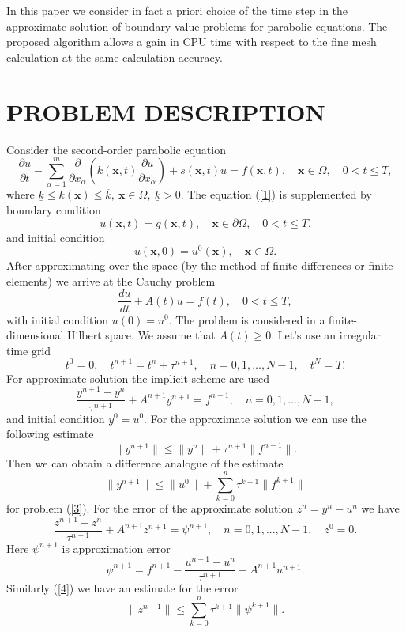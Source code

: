 \documentclass{aip-cp}
\begin{document}
In this paper we consider in fact a priori choice of the time step in the approximate solution of boundary value problems for parabolic equations. The proposed algorithm allows a gain in CPU time with respect to the fine mesh calculation at the same calculation accuracy.

\section{PROBLEM DESCRIPTION}
Consider the second-order parabolic equation
\begin{equation}\label{1}
   \frac{\partial u}{\partial t} 
   - \sum_{\alpha =1}^{m}
   \frac{\partial }{\partial x_\alpha} 
   \left ( k({\bm x},t)  \frac{\partial u}{\partial x_\alpha} \right ) + s({\bm x},t) u = f({\bm x},t),
   \quad {\bm x}\in \Omega,
   \quad 0 < t \leq  T,
\end{equation}
where
$\underline{k} \leq k({\bm x}) \leq  \overline{k}, \ {\bm x} \in \Omega, \ \underline{k} > 0$.
The equation (\ref{1}) is supplemented by boundary  condition
\[
   u({\bm x},t) = g({\bm x},t),
   \quad {\bm x}\in \partial \Omega,
   \quad 0 < t \leq  T.
\]
and initial condition
\[
   u({\bm x},0) = u^0({\bm x}),
   \quad {\bm x}\in \Omega.
\]
After approximating over the space (by the method of finite differences or finite elements) we arrive at the Cauchy problem
\begin{equation}\label{2}
\frac{du}{dt} + A(t)u =f(t), \quad 0 < t \leq T,
\end{equation}
with initial condition $u(0) = u^0$. The problem is considered in a finite-dimensional Hilbert space.
We assume that $A(t) \geq 0$.
Let's use an irregular time grid
\[
t^0 = 0, \quad t^{n+1} = t^n + \tau^{n+1}, \quad 
n = 0, 1, ... , N-1, \quad t^N = T.
\]
For approximate solution the implicit scheme are used
\begin{equation}\label{3}
  \frac{y^{n+1} - y^{n}}{\tau^{n+1}} + A^{n+1} y^{n+1} = f^{n+1},
  \quad n = 0,1, ..., N-1, 
\end{equation}
and initial condition 
$
y^0 = u^0 .
$
For the approximate solution we can use the following estimate
\[
 \|y^{n+1}\| \leq \|y^{n}\| + \tau^{n+1} \|f^{n+1}\| .
\]
Then we can obtain a difference analogue of the estimate
\begin{equation}\label{4}
 \|y^{n+1}\| \leq \|u^{0}\| + \sum_{k=0}^{n} \tau^{k+1} \|f^{k+1}\|
\end{equation}
for problem (\ref{3}).
For the error of the approximate solution $z^n = y^n - u^n$ we have
\[
  \frac{z^{n+1} - z^{n}}{\tau^{n+1}} + A^{n+1} z^{n+1} = \psi^{n+1},
  \quad n = 0,1, ..., N-1,  \quad
 z^0 = 0.
\]
Here $\psi^{n+1}$ is approximation error
\begin{equation}\label{5}
 \psi^{n+1} = f^{n+1} -
 \frac{u^{n+1} - u^{n}}{\tau^{n+1}} - A^{n+1} u^{n+1} . 
\end{equation}
Similarly (\ref{4}) we have an estimate for the error
\begin{equation}\label{6}
  \|z^{n+1}\| \leq \sum_{k=0}^{n} \tau^{k+1} \|\psi^{k+1}\| .
\end{equation} 
\end{document}
